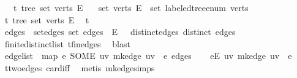 \begin{isabellebody}
\ \ \ t{\isacharcolon}{\kern0pt}\ {\isachardoublequoteopen}tree\ {\isacharparenleft}{\kern0pt}set\ verts{\isacharparenright}{\kern0pt}\ E{\isachardoublequoteclose}\isanewline
\ \ \ {\isachardoublequoteopen}{\isacharparenleft}{\kern0pt}set\ verts{\isacharcomma}{\kern0pt}\ E{\isacharparenright}{\kern0pt}\ {\isasymin}\ set\ {\isacharparenleft}{\kern0pt}labeled{\isacharunderscore}{\kern0pt}tree{\isacharunderscore}{\kern0pt}enum\ verts{\isacharparenright}{\kern0pt}{\isachardoublequoteclose}\isanewline
%
\isadelimproof
%
\endisadelimproof
%
\isatagproof
{}\isamarkupfalse%
{\isacharminus}{\kern0pt}\isanewline
\ \ \isamarkupfalse%
\ t{\isacharcolon}{\kern0pt}\ tree\ {\isachardoublequoteopen}set\ verts{\isachardoublequoteclose}\ E\ \isamarkupfalse%
\ t\ \isacommand{{\isachardot}{\kern0pt}}\isamarkupfalse%
\isanewline
\ \ \isamarkupfalse%
\ edges\ \ set{\isacharunderscore}{\kern0pt}edges{\isacharcolon}{\kern0pt}\ {\isachardoublequoteopen}set\ edges\ {\isacharequal}{\kern0pt}\ E{\isachardoublequoteclose}\ \ \ distinct{\isacharunderscore}{\kern0pt}edges{\isacharcolon}{\kern0pt}\ {\isachardoublequoteopen}distinct\ edges{\isachardoublequoteclose}\ \isamarkupfalse%
\ finite{\isacharunderscore}{\kern0pt}distinct{\isacharunderscore}{\kern0pt}list\ t{\isachardot}{\kern0pt}fin{\isacharunderscore}{\kern0pt}edges\ \isamarkupfalse%
\ blast\isanewline
\ \ \isamarkupfalse%
\ {\isacharquery}{\kern0pt}edge{\isacharunderscore}{\kern0pt}list\ {\isacharequal}{\kern0pt}\ {\isachardoublequoteopen}map\ {\isacharparenleft}{\kern0pt}{\isasymlambda}e{\isachardot}{\kern0pt}\ SOME\ uv{\isachardot}{\kern0pt}\ mk{\isacharunderscore}{\kern0pt}edge\ uv\ {\isacharequal}{\kern0pt}\ e{\isacharparenright}{\kern0pt}\ edges{\isachardoublequoteclose}\isanewline
\ \ \isamarkupfalse%
\ {\isachardoublequoteopen}{\isasymforall}e{\isasymin}E{\isachardot}{\kern0pt}\ {\isasymexists}uv{\isachardot}{\kern0pt}\ mk{\isacharunderscore}{\kern0pt}edge\ uv\ {\isacharequal}{\kern0pt}\ e{\isachardoublequoteclose}\ \isamarkupfalse%
\ t{\isachardot}{\kern0pt}two{\isacharunderscore}{\kern0pt}edges\ card{\isacharunderscore}{\kern0pt}{}{\isacharunderscore}{\kern0pt}iff\ \isamarkupfalse%
\ {\isacharparenleft}{\kern0pt}metis\ mk{\isacharunderscore}{\kern0pt}edge{\isachardot}{\kern0pt}simps{\isacharparenright}{\kern0pt}\isanewline
\ \ \isamarkupfalse%
\ \isamarkupfalse%

\end{isabellebody}
